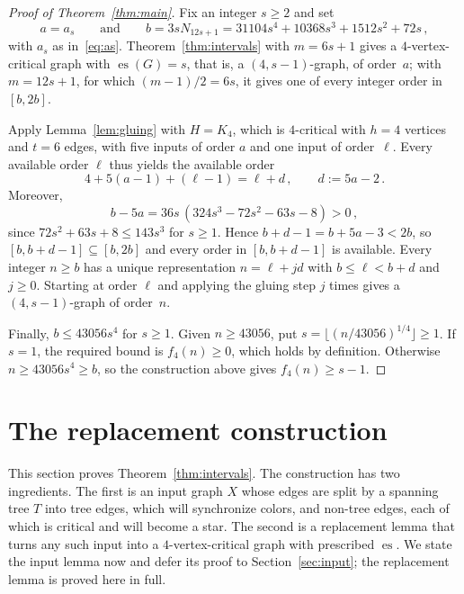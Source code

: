 \documentclass[11pt,letterpaper]{article}
\numberwithin{equation}{section}
\theoremstyle{plain}
\theoremstyle{definition}
\theoremstyle{remark}
\DeclareMathOperator{\es}{es}
\newcommand{\N}[1]{N_{#1}}
\begin{document}
\begin{proof}[Proof of Theorem~\ref{thm:main}]
Fix an integer $s\ge 2$ and set
\begin{equation*}
  a=a_s\qquad\mbox{and}\qquad b=3s\N{12s+1}=31104s^4+10368s^3+1512s^2+72s\,,
\end{equation*}
with $a_s$ as in~\eqref{eq:as}. Theorem~\ref{thm:intervals} with $m=6s+1$ gives a $4$-vertex-critical graph with $\es(G)=s$, that is, a $(4,s-1)$-graph, of order~$a$; with $m=12s+1$, for which $(m-1)/2=6s$, it gives one of every integer order in $[b,2b]$.

Apply Lemma~\ref{lem:gluing} with $H=K_4$, which is $4$-critical with $h=4$ vertices and $t=6$ edges, with five inputs of order $a$ and one input of order~$\ell$. Every available order $\ell$ thus yields the available order
\begin{equation*}
  4+5(a-1)+(\ell-1)=\ell+d\,,\qquad d:=5a-2\,.
\end{equation*}
Moreover,
\begin{equation*}
  b-5a=36s\,(324s^3-72s^2-63s-8)>0\,,
\end{equation*}
since $72s^2+63s+8\le 143s^3$ for $s\ge 1$. Hence $b+d-1=b+5a-3<2b$, so $[b,b+d-1]\subseteq[b,2b]$ and every order in $[b,b+d-1]$ is available. Every integer $n\ge b$ has a unique representation $n=\ell+jd$ with $b\le \ell<b+d$ and $j\ge 0$. Starting at order $\ell$ and applying the gluing step $j$ times gives a $(4,s-1)$-graph of order~$n$.

Finally, $b\le 43056s^4$ for $s\ge 1$. Given $n\ge 43056$, put $s=\lfloor (n/43056)^{1/4}\rfloor\ge 1$. If $s=1$, the required bound is $f_4(n)\ge 0$, which holds by definition. Otherwise $n\ge 43056s^4\ge b$, so the construction above gives $f_4(n)\ge s-1$.
\end{proof}

\section{The replacement construction}\label{sec:replacement}

This section proves Theorem~\ref{thm:intervals}. The construction has two ingredients. The first is an input graph $X$ whose edges are split by a spanning tree $T$ into tree edges, which will synchronize colors, and non-tree edges, each of which is critical and will become a star. The second is a replacement lemma that turns any such input into a $4$-vertex-critical graph with prescribed $\es$. We state the input lemma now and defer its proof to Section~\ref{sec:input}; the replacement lemma is proved here in full.
\end{document}
